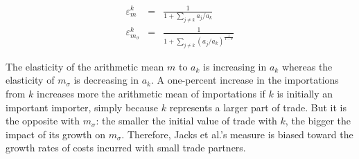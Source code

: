 \documentclass{article}
\begin{document}
\begin{eqnarray*}
\varepsilon_m^k&=& \frac{1}{1+\sum\limits_{j \neq k} a_j/a_k}\\
\varepsilon_{m_{\sigma}}^k&=&\frac{1}{1+\sum\limits_{j\neq k} (a_j/a_k)^{\frac{1}{1-\sigma}}}
\end{eqnarray*}

The elasticity of the arithmetic mean $m$ to $a_k$ is
increasing in $a_k$ whereas the elasticity of $m_{\sigma}$ is
decreasing in $a_k$. A one-percent increase in the importations
from $k$ increases more the arithmetic mean of importations if
$k$ is initially an important importer, simply because $k$
represents a larger part of trade. But it is the opposite with
$m_{\sigma}$: the smaller the initial value of trade with $k$,
the bigger the impact of its growth on $m_{\sigma}$. Therefore,
Jacks et al.'s measure is biased toward the growth rates of
costs incurred with small trade partners.

\nocite{*}


\end{document}
